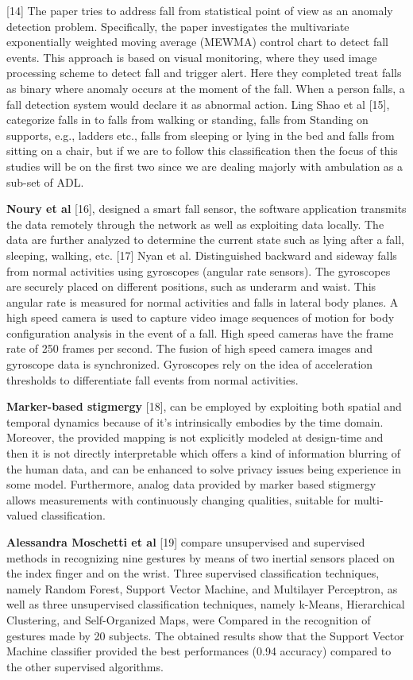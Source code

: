 \documentclass[a4paper, parskip=full]{scrartcl}
\begin{document}
[14] The paper tries to address fall from statistical point of view as an anomaly detection problem. Specifically, the paper investigates the multivariate exponentially weighted moving average (MEWMA) control chart to detect fall events. This approach is based on visual monitoring, where they used image processing scheme to detect fall and trigger alert. Here they completed treat falls as binary where anomaly occurs at the moment of the fall. When a person falls, a fall detection system would declare it as abnormal action. Ling Shao et al [15], categorize falls in to falls from walking or standing, falls from Standing on supports, e.g., ladders etc., falls from sleeping or lying in the bed and falls from sitting on a chair, but if we are to follow this classification then the focus of this studies will be on the first two since we are dealing majorly with ambulation as a sub-set of ADL.

\textbf{Noury et al} [16], designed a smart fall sensor, the software application transmits the data remotely through the network as well as exploiting data locally. The data are further analyzed to determine the current state such as lying after a fall, sleeping, walking, etc. [17] Nyan et al.  Distinguished backward and sideway falls from normal activities using gyroscopes (angular rate sensors). The gyroscopes are securely placed on different positions, such as underarm and waist. This angular rate is measured for normal activities and falls in lateral body planes. A high speed camera is used to capture video image sequences of motion for body configuration analysis in the event of a fall. High speed cameras have the frame rate of 250 frames per second. The fusion of high speed camera images and gyroscope data is synchronized. Gyroscopes rely on the idea of acceleration thresholds to differentiate fall events from normal activities.

\textbf{Marker-based stigmergy} [18], can be employed by exploiting both spatial and temporal dynamics because of it’s intrinsically embodies by the time domain. Moreover, the provided mapping is not explicitly modeled at design-time and then it is not directly interpretable which offers a kind of information blurring of the human data, and can be enhanced to solve privacy issues being experience in some model. Furthermore, analog data provided by marker based stigmergy allows measurements with continuously changing qualities, suitable for multi-valued classification.

\textbf{Alessandra Moschetti et al} [19] compare unsupervised and supervised methods in recognizing nine gestures by means of two inertial sensors placed on the index finger and on the wrist. Three supervised classification techniques, namely Random Forest, Support Vector Machine, and Multilayer Perceptron, as well as three unsupervised classification techniques, namely k-Means, Hierarchical Clustering, and Self-Organized Maps, were Compared in the recognition of gestures made by 20 subjects. The obtained results show that the Support Vector Machine classifier provided the best performances (0.94 accuracy) compared to the other supervised algorithms.
\end{document}
